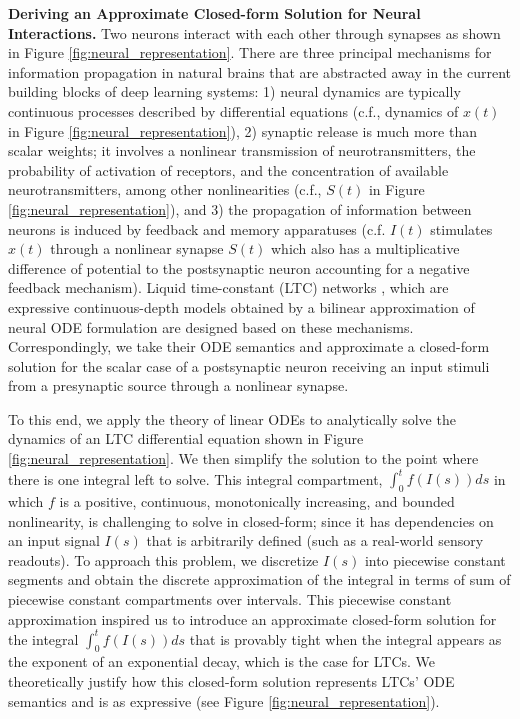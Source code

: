 \documentclass[12pt]{article}
\begin{document}
\noindent \textbf{Deriving an Approximate Closed-form Solution for Neural Interactions.} Two neurons interact with each other through synapses as shown in Figure \ref{fig:neural_representation}. There are three principal mechanisms for information propagation in natural brains that are abstracted away in the current building blocks of deep learning systems: 1) neural dynamics are typically continuous processes described by differential equations (c.f., dynamics of $x(t)$ in Figure \ref{fig:neural_representation}), 2) synaptic release is much more than scalar weights; it involves a nonlinear transmission of neurotransmitters, the probability of activation of receptors, and the concentration of available neurotransmitters, among other nonlinearities (c.f., $S(t)$ in Figure \ref{fig:neural_representation}), and 3) the propagation of information between neurons is induced by feedback and memory apparatuses (c.f. $I(t)$ stimulates $x(t)$ through a nonlinear synapse $S(t)$ which also has a multiplicative difference of potential to the postsynaptic neuron accounting for a negative feedback mechanism). Liquid time-constant (LTC) networks \cite{hasani2021liquid}, which are expressive continuous-depth models obtained by a bilinear approximation \cite{friston2003dynamic} of neural ODE formulation \cite{chen2018neural} are designed based on these mechanisms. Correspondingly, we take their ODE semantics and approximate a closed-form solution for the scalar case of a postsynaptic neuron receiving an input stimuli from a presynaptic source through a nonlinear synapse. 

To this end, we apply the theory of linear ODEs \cite{PerkoODEs} to analytically solve the dynamics of an LTC differential equation shown in Figure \ref{fig:neural_representation}. We then simplify the solution to the point where there is one integral left to solve. This integral compartment, $\int_0^t f(I(s)) ds$ in which $f$ is a positive, continuous, monotonically increasing, and bounded nonlinearity, is challenging to solve in closed-form; since it has dependencies on an input signal $I(s)$ that is arbitrarily defined (such as a real-world sensory readouts). To approach this problem, we discretize $I(s)$ into piecewise constant segments and obtain the discrete approximation of the integral in terms of sum of piecewise constant compartments over intervals. This piecewise constant approximation inspired us to introduce an approximate closed-form solution for the integral $\int_0^t f(I(s)) ds$ that is provably tight when the integral appears as the exponent of an exponential decay, which is the case for LTCs. We theoretically justify how this closed-form solution represents LTCs' ODE semantics and is as expressive (see Figure \ref{fig:neural_representation}). 
\end{document}
